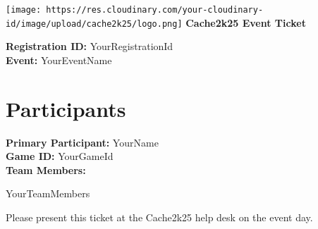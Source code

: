 \documentclass[a4paper]{article}
\begin{document}
\pagestyle{empty}

\begin{center}
    \texttt{[image: https://res.cloudinary.com/your-cloudinary-id/image/upload/cache2k25/logo.png]} %
    \vspace{10pt}
    \textbf{\Huge \color{titleblue} Cache2k25 Event Ticket}
\end{center}

\vspace{20pt}

\begin{center}
    \Large \textbf{Registration ID:} YourRegistrationId \\
    \vspace{10pt}
    \large \textbf{Event:} YourEventName \\
    \vspace{10pt}
\end{center}

\section*{Participants}
\textbf{Primary Participant:} YourName \\
\ifx\YourGameId\empty\else\textbf{Game ID:} YourGameId \\\fi
\ifx\YourTeamMembers\empty\else
\vspace{10pt}
\textbf{Team Members:}
\begin{itemize}
    YourTeamMembers
\end{itemize}
\fi

\vspace{20pt}

\begin{center}
    \small \color{headergray} Please present this ticket at the Cache2k25 help desk on the event day.
\end{center}
\end{document}

